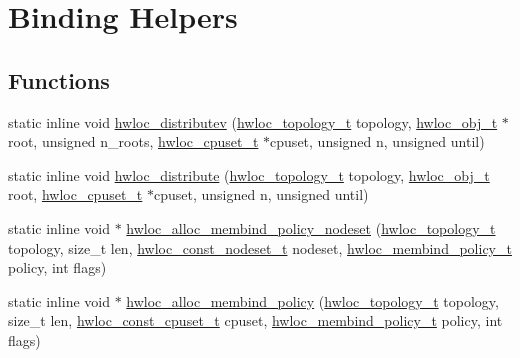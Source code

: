 \hypertarget{a00059}{
\section{Binding Helpers}
\label{a00059}
}
\subsection*{Functions}
\begin{DoxyCompactItemize}
\item 
static inline void \hyperlink{a00059_gaf057d7c5e3cb3df897ce527258537619}{hwloc\_\-distributev} (\hyperlink{a00039_ga9d1e76ee15a7dee158b786c30b6a6e38}{hwloc\_\-topology\_\-t} topology, \hyperlink{a00016}{hwloc\_\-obj\_\-t} $\ast$root, unsigned n\_\-roots, \hyperlink{a00040_ga4bbf39b68b6f568fb92739e7c0ea7801}{hwloc\_\-cpuset\_\-t} $\ast$cpuset, unsigned n, unsigned until)
\item 
static inline void \hyperlink{a00059_ga6d5c88292ad5aa062c1bebc99369c042}{hwloc\_\-distribute} (\hyperlink{a00039_ga9d1e76ee15a7dee158b786c30b6a6e38}{hwloc\_\-topology\_\-t} topology, \hyperlink{a00016}{hwloc\_\-obj\_\-t} root, \hyperlink{a00040_ga4bbf39b68b6f568fb92739e7c0ea7801}{hwloc\_\-cpuset\_\-t} $\ast$cpuset, unsigned n, unsigned until)
\item 
static inline void $\ast$ \hyperlink{a00059_ga3e772fbc4de626ed80f13d332b7d4d03}{hwloc\_\-alloc\_\-membind\_\-policy\_\-nodeset} (\hyperlink{a00039_ga9d1e76ee15a7dee158b786c30b6a6e38}{hwloc\_\-topology\_\-t} topology, size\_\-t len, \hyperlink{a00040_ga2f5276235841ad66a79bedad16a5a10c}{hwloc\_\-const\_\-nodeset\_\-t} nodeset, \hyperlink{a00050_gac9764f79505775d06407b40f5e4661e8}{hwloc\_\-membind\_\-policy\_\-t} policy, int flags)
\item 
static inline void $\ast$ \hyperlink{a00059_ga6178c6a9ec1dd88ec9f6a9fcdcc7d634}{hwloc\_\-alloc\_\-membind\_\-policy} (\hyperlink{a00039_ga9d1e76ee15a7dee158b786c30b6a6e38}{hwloc\_\-topology\_\-t} topology, size\_\-t len, \hyperlink{a00040_ga1f784433e9b606261f62d1134f6a3b25}{hwloc\_\-const\_\-cpuset\_\-t} cpuset, \hyperlink{a00050_gac9764f79505775d06407b40f5e4661e8}{hwloc\_\-membind\_\-policy\_\-t} policy, int flags)
\end{DoxyCompactItemize}


